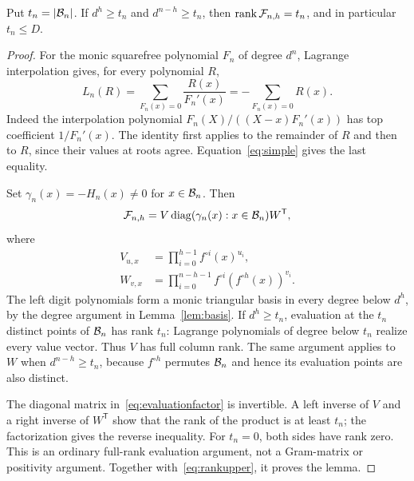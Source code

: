\begin{lemma}\label{lem:evalrank}
Put $t_n=|\mathcal B_n|$. If $d^h\ge t_n$ and $d^{n-h}\ge t_n$,
then $\operatorname{rank}\mathcal F_{n,h}=t_n$, and in particular $t_n\le D$.
\end{lemma}
\begin{proof}
For the monic squarefree polynomial $F_n$ of degree $d^n$,
Lagrange interpolation gives, for every polynomial $R$,
\begin{equation}\label{eq:lagrange}
 L_n(R)=\sum_{F_n(x)=0}\frac{R(x)}{F_n'(x)}
       =-\sum_{F_n(x)=0}R(x).
\end{equation}
Indeed the interpolation polynomial
$F_n(X)/((X-x)F_n'(x))$ has top coefficient $1/F_n'(x)$.
The identity first applies to the remainder of $R$ and then to
$R$, since their values at roots agree. Equation~\eqref{eq:simple}
gives the last equality.

Set $\gamma_n(x)=-H_n(x)\ne0$ for $x\in\mathcal B_n$. Then
\begin{equation}\label{eq:evaluationfactor}
 \mathcal F_{n,h}=V\operatorname{diag}(\gamma_n(x):x\in\mathcal B_n)W^{\mathsf T},
\end{equation}
where
\begin{align*}
 V_{u,x}&=\prod_{i=0}^{h-1}f^{\circ i}(x)^{u_i},\\
 W_{v,x}&=\prod_{i=0}^{n-h-1}
                       f^{\circ i}(f^{\circ h}(x))^{v_i}.
\end{align*}
The left digit polynomials form a monic triangular basis in every
degree below $d^h$, by the degree argument in
Lemma~\ref{lem:basis}. If $d^h\ge t_n$, evaluation at the
$t_n$ distinct points of $\mathcal B_n$ has rank $t_n$: Lagrange
polynomials of degree below $t_n$ realize every value vector.
Thus $V$ has full column rank. The same argument applies to $W$
when $d^{n-h}\ge t_n$, because $f^{\circ h}$ permutes
$\mathcal B_n$ and hence its evaluation points are also distinct.

The diagonal matrix in~\eqref{eq:evaluationfactor} is invertible.
A left inverse of $V$ and a right inverse of $W^{\mathsf T}$
show that the rank of the product is at least $t_n$; the
factorization gives the reverse inequality. For $t_n=0$, both
sides have rank zero. This is an ordinary full-rank evaluation
argument, not a Gram-matrix or positivity argument.
Together with~\eqref{eq:rankupper}, it proves the lemma.
\end{proof}

